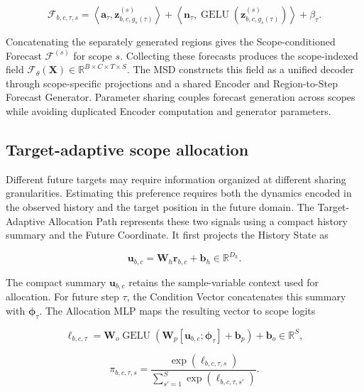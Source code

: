 \documentclass[final,3p,times]{elsarticle}
\begin{document}
\begin{equation}
\mathcal F_{b,c,\tau,s}
=
\left\langle
\mathbf a_\tau,
\mathbf z_{b,c,g_s(\tau)}^{(s)}
\right\rangle
+
\left\langle
\mathbf n_\tau,
\operatorname{GELU}\!\left(
\mathbf z_{b,c,g_s(\tau)}^{(s)}
\right)
\right\rangle
+
\beta_\tau.
\end{equation}


Concatenating the separately generated regions gives the Scope-conditioned Forecast $\mathcal F^{(s)}$ for scope $s$. Collecting these forecasts produces the scope-indexed field $\mathcal F_\theta(\mathbf X)\in\mathbb R^{B\times C\times T\times S}$. The MSD constructs this field as a unified decoder through scope-specific projections and a shared Encoder and Region-to-Step Forecast Generator. Parameter sharing couples forecast generation across scopes while avoiding duplicated Encoder computation and generator parameters.

\subsection{Target-adaptive scope allocation}


Different future targets may require information organized at different sharing granularities. Estimating this preference requires both the dynamics encoded in the observed history and the target position in the future domain. The Target-Adaptive Allocation Path represents these two signals using a compact history summary and the Future Coordinate. It first projects the History State as

\begin{equation}
\mathbf u_{b,c}
=
\mathbf W_h\mathbf r_{b,c}
+
\mathbf b_h
\in\mathbb R^{D_h}.
\end{equation}


The compact summary $\mathbf u_{b,c}$ retains the sample-variable context used for allocation. For future step $\tau$, the Condition Vector concatenates this summary with $\boldsymbol\phi_\tau$. The Allocation MLP maps the resulting vector to scope logits

\begin{equation}
\boldsymbol\ell_{b,c,\tau}
=
\mathbf W_o
\operatorname{GELU}\!\left(
\mathbf W_p
[\mathbf u_{b,c};\boldsymbol\phi_\tau]
+
\mathbf b_p
\right)
+
\mathbf b_o
\in\mathbb R^S,
\end{equation}


\begin{equation}
\pi_{b,c,\tau,s}
=
\frac{
\exp(\ell_{b,c,\tau,s})
}{
\sum_{s'=1}^{S}
\exp(\ell_{b,c,\tau,s'})
}.
\end{equation}
\end{document}
